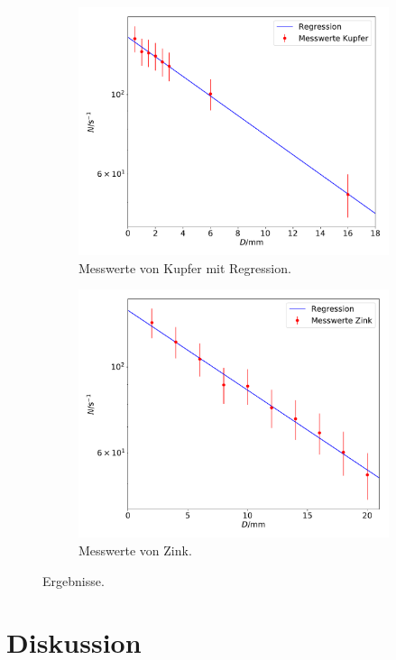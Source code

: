 \begin{figure}
  \begin{subfigure}{0.5\textwidth}
    \centering
    \includegraphics[width=\textwidth]{CuGamma.pdf}
    \caption{Messwerte von Kupfer mit Regression.}
    \label{sub:1}
  \end{subfigure}
  \begin{subfigure}{0.5\textwidth}
    \centering
    \includegraphics[width=\textwidth]{ZnGamma.pdf}
    \caption{Messwerte von Zink.}
    \label{sub:2}
  \end{subfigure}
  \caption{Ergebnisse.}
  \label{fig:1}
\end{figure}

\section{Diskussion}
\newpage
\nocite{*}
\printbibliography

